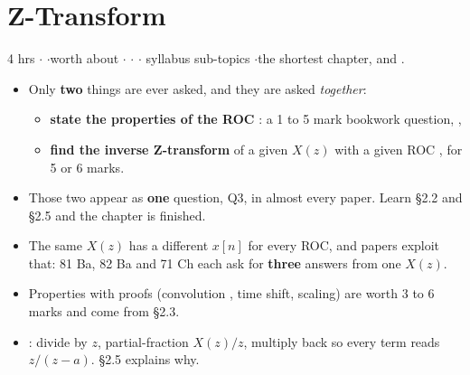 \section{Z-Transform}

{\color{sub}\footnotesize 4 hrs \gap$\cdot$\gap {}
\gap$\cdot$\gap worth about  \gap$\cdot$\gap {} \gap$\cdot$\gap {} \gap$\cdot$ syllabus sub-topics
\gap$\cdot$\gap the shortest chapter, and .}

\begin{itemize}
  \item Only \textbf{two} things are ever asked, and they are asked \emph{together}:
  \begin{itemize}
    \item \textbf{state the properties of the ROC} : a 1 to 5 mark bookwork
          question, ,
    \item \textbf{find the inverse Z-transform} of a given $X(z)$ with a given ROC
          , for 5 or 6 marks.
  \end{itemize}
  \item Those two appear as \textbf{one} question, Q3, in almost every paper. Learn
        \S2.2 and \S2.5 and the chapter is finished.
  \item {} The same $X(z)$ has a different $x[n]$ for every
        ROC, and papers exploit that: 81 Ba, 82 Ba and 71 Ch each ask for
        \textbf{three} answers from one $X(z)$.
  \item Properties with proofs (convolution , time shift, scaling) are worth 3 to 6
        marks and come from \S2.3.
  \item {}: divide by $z$, partial-fraction
        $X(z)/z$, multiply back so every term reads $z/(z-a)$. \S2.5 explains why.
\end{itemize}

